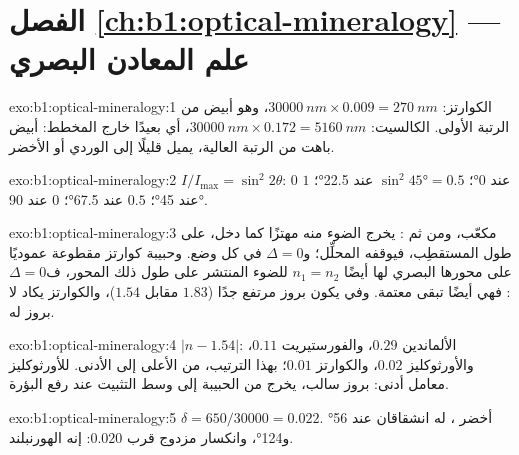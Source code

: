 \section*{الفصل \ref{ch:b1:optical-mineralogy} --- علم المعادن البصري}

\begin{solution}{exo:b1:optical-mineralogy:1}
الكوارتز: $\qty{30000}{nm}\times0.009 = \qty{270}{nm}$، وهو أبيض من الرتبة الأولى.
الكالسيت: $\qty{30000}{nm}\times0.172 = \qty{5160}{nm}$، أي بعيدًا خارج المخطط:
أبيض باهت من الرتبة العالية، يميل قليلًا إلى الوردي أو الأخضر.
\end{solution}

\begin{solution}{exo:b1:optical-mineralogy:2}
$I/I_{\max} = \sin^2 2\theta$: $0$ عند \ang{0}؛ $\sin^2\ang{45} = 0.5$ عند \ang{22.5}؛ $1$ عند \ang{45}؛ $0.5$ عند \ang{67.5}؛ $0$ عند \ang{90}.
\end{solution}

\begin{solution}{exo:b1:optical-mineralogy:3}
 مكعّب، ومن ثم : يخرج الضوء منه مهتزًا كما دخل، على طول المستقطِب، فيوقفه المحلِّل؛ و$\Delta = 0$ في كل وضع. وحبيبة كوارتز مقطوعة عموديًا على محورها البصري لها أيضًا $n_1 = n_2$ للضوء المنتشر على طول ذلك المحور، ف$\Delta = 0$: فهي أيضًا تبقى معتمة. وفي  يكون  بروز مرتفع جدًا ($1.83$ مقابل $1.54$)، والكوارتز يكاد لا بروز له.
\end{solution}

\begin{solution}{exo:b1:optical-mineralogy:4}
$|n - 1.54|$: الألماندين $0.29$، والفورستيريت $0.11$، والأورثوكليز $0.02$، والكوارتز $0.01$؛  بهذا الترتيب، من الأعلى إلى الأدنى. للأورثوكليز معامل أدنى: بروز سالب،  يخرج من الحبيبة إلى وسط التثبيت عند رفع البؤرة.
\end{solution}

\begin{solution}{exo:b1:optical-mineralogy:5}
$\delta = 650/30000 = 0.022$.  أخضر ، له انشقاقان عند \ang{56} و\ang{124}، وانكسار مزدوج قرب $0.020$: إنه الهورنبلند.
\end{solution}

